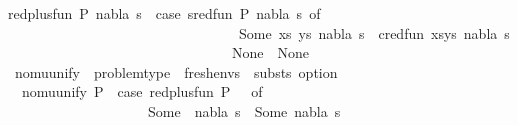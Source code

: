 \begin{isabellebody}
{\isachardoublequoteopen}red{\isacharunderscore}{\kern0pt}plus{\isacharunderscore}{\kern0pt}fun\ {\isacharparenleft}{\kern0pt}P{\isacharcomma}{\kern0pt}\ nabla{\isacharcomma}{\kern0pt}\ s{\isacharparenright}{\kern0pt}\ {\isacharequal}{\kern0pt}\ {\isacharparenleft}{\kern0pt}case\ sred{\isacharunderscore}{\kern0pt}fun\ {\isacharparenleft}{\kern0pt}P{\isacharcomma}{\kern0pt}\ nabla{\isacharcomma}{\kern0pt}\ s{\isacharparenright}{\kern0pt}\ of\isanewline
\ \ \ \ \ \ \ \ \ \ \ \ \ \ \ \ \ \ \ \ \ \ \ \ \ \ \ \ \ \ \ \ \ Some\ {\isacharparenleft}{\kern0pt}{\isacharparenleft}{\kern0pt}xs{\isacharcomma}{\kern0pt}\ ys{\isacharparenright}{\kern0pt}{\isacharcomma}{\kern0pt}\ nabla{\isacharprime}{\kern0pt}{\isacharcomma}{\kern0pt}\ s{\isacharprime}{\kern0pt}{\isacharparenright}{\kern0pt}\ {\isasymRightarrow}\ cred{\isacharunderscore}{\kern0pt}fun\ {\isacharparenleft}{\kern0pt}{\isacharparenleft}{\kern0pt}xs{\isacharcomma}{\kern0pt}ys{\isacharparenright}{\kern0pt}{\isacharcomma}{\kern0pt}\ nabla{\isacharprime}{\kern0pt}{\isacharcomma}{\kern0pt}\ s{\isacharprime}{\kern0pt}{\isacharparenright}{\kern0pt}\isanewline
\ \ \ \ \ \ \ \ \ \ \ \ \ \ \ \ \ \ \ \ \ \ \ \ \ \ \ \ \ \ \ {\isacharbar}{\kern0pt}\ None\ {\isasymRightarrow}\ None{\isacharparenright}{\kern0pt}{\isachardoublequoteclose}\isanewline
\isanewline
{}\isamarkupfalse%
\ nomu{\isacharunderscore}{\kern0pt}unify\ {\isacharcolon}{\kern0pt}{\isacharcolon}{\kern0pt}\ {\isachardoublequoteopen}problem{\isacharunderscore}{\kern0pt}type\ {\isasymRightarrow}\ {\isacharparenleft}{\kern0pt}fresh{\isacharunderscore}{\kern0pt}envs\ {\isasymtimes}\ substs{\isacharparenright}{\kern0pt}\ option{\isachardoublequoteclose}\ \isanewline
\ \ {\isachardoublequoteopen}nomu{\isacharunderscore}{\kern0pt}unify\ P\ {\isacharequal}{\kern0pt}\ {\isacharparenleft}{\kern0pt}case\ red{\isacharunderscore}{\kern0pt}plus{\isacharunderscore}{\kern0pt}fun\ {\isacharparenleft}{\kern0pt}P{\isacharcomma}{\kern0pt}\ {\isacharbraceleft}{\kern0pt}{\isacharbraceright}{\kern0pt}{\isacharcomma}{\kern0pt}\ {\isacharbrackleft}{\kern0pt}{\isacharbrackright}{\kern0pt}{\isacharparenright}{\kern0pt}\ of\ \isanewline
\ \ \ \ \ \ \ \ \ \ \ \ \ \ \ \ \ \ \ \ Some\ {\isacharparenleft}{\kern0pt}{\isacharunderscore}{\kern0pt}{\isacharcomma}{\kern0pt}\ nabla{\isacharprime}{\kern0pt}{\isacharcomma}{\kern0pt}\ s{\isacharprime}{\kern0pt}{\isacharparenright}{\kern0pt}\ {\isasymRightarrow}\ Some\ {\isacharparenleft}{\kern0pt}nabla{\isacharprime}{\kern0pt}{\isacharcomma}{\kern0pt}\ s{\isacharprime}{\kern0pt}{\isacharparenright}{\kern0pt}\isanewline

\end{isabellebody}
